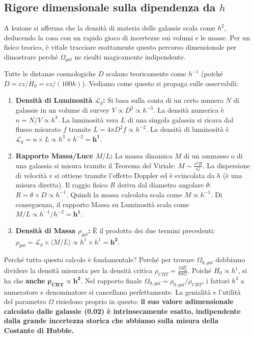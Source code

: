 \documentclass[11pt,a4paper]{report}
\begin{document}
\subsection{Rigore dimensionale sulla dipendenza da $h$}
A lezione si afferma che la densità di materia delle galassie scala come $h^2$, deducendo la cosa con un rapido gioco di incertezze sui volumi e le masse. Per un fisico teorico, è vitale tracciare esattamente questo percorso dimensionale per dimostrare perché $\Omega_{gal}$ ne risulti magicamente indipendente.

Tutte le distanze cosmologiche $D$ scalano teoricamente come $h^{-1}$ (poiché $D = cz/H_0 = cz/(100h)$).
Vediamo come questo si propaga sulle osservabili:
\begin{enumerate}
    \item \textbf{Densità di Luminosità $\mathcal{L}_g$:} Si basa sulla conta di un certo numero $N$ di galassie in un volume di survey $V \propto D^3 \propto h^{-3}$. La densità numerica è $n = N/V \propto h^3$. La luminosità vera $L$ di una singola galassia si ricava dal flusso misurato $f$ tramite $L = 4\pi D^2 f \propto h^{-2}$. La densità di luminosità è $\mathcal{L}_g = n \times L \propto h^3 \times h^{-2} = \mathbf{h^1}$.
    \item \textbf{Rapporto Massa/Luce $M/L$:} La massa dinamica $M$ di un ammasso o di una galassia si misura tramite il Teorema del Viriale: $M \sim \frac{v^2 R}{G}$. La dispersione di velocità $v$ si ottiene tramite l'effetto Doppler ed è svincolata da $h$ (è una misura diretta). Il raggio fisico $R$ deriva dal diametro angolare $\theta$: $R = \theta \times D \propto h^{-1}$. Quindi la massa calcolata scala come $M \propto h^{-1}$. Di conseguenza, il rapporto Massa su Luminosità scala come $M/L \propto h^{-1} / h^{-2} = \mathbf{h^1}$.
    \item \textbf{Densità di Massa $\rho_{gal}$:} È il prodotto dei due termini precedenti: $\rho_{gal} = \mathcal{L}_g \times \langle M/L \rangle \propto h^1 \times h^1 = \mathbf{h^2}$.
\end{enumerate}
Perché tutto questo calcolo è fondamentale?
Perché per trovare $\Omega_{0,gal}$ dobbiamo dividere la densità misurata per la densità critica $\rho_{CRT} = \frac{3H_0^2}{8\pi G}$. Poiché $H_0 \propto h^1$, si ha che \textbf{anche $\mathbf{\rho_{CRT} \propto h^2}$}.
Nel rapporto finale $\Omega_{0,gal} = \rho_{0,gal} / \rho_{CRT}$, i fattori $h^2$ a numeratore e denominatore si cancellano perfettamente. La genialità e l'utilità del parametro $\Omega$ risiedono proprio in questo: \textbf{il suo valore adimensionale calcolato dalle galassie (0.02) è intrinsecamente esatto, indipendente dalla grande incertezza storica che abbiamo sulla misura della Costante di Hubble.}
\end{document}
